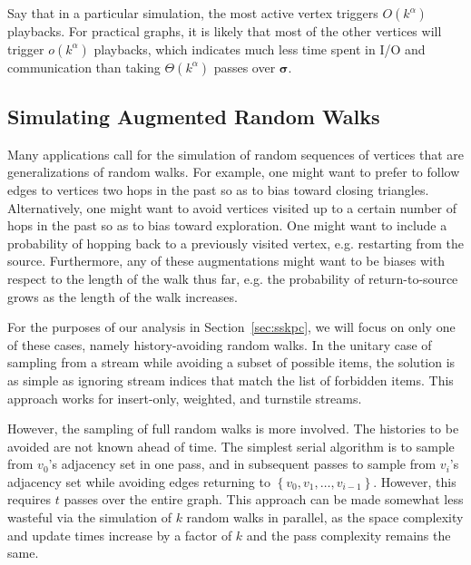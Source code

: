 \documentclass[10]{article}
\begin{document}
Say that in a particular simulation, the most active vertex triggers $O(k^\alpha)$ playbacks.
For practical graphs, it is likely that most of the other vertices will trigger $o(k^\alpha)$ playbacks, which indicates much less time spent in I/O and communication than taking $\Theta(k^\alpha)$ passes over $\boldsymbol{\sigma}$.



\subsection{Simulating Augmented Random Walks}
 \label{walks:sec:walks:augmented}

Many applications call for the simulation of random sequences of vertices that are generalizations of random walks. 
For example, one might want to prefer to follow edges to vertices two hops in the past so as to bias toward closing triangles. 
Alternatively, one might want to avoid vertices visited up to a certain number of hops in the past so as to bias toward exploration. 
One might want to include a probability of hopping back to a previously visited vertex, e.g. restarting from the source. 
Furthermore, any of these augmentations might want to be biases with respect to the length of the walk thus far, e.g. the probability of return-to-source grows as the length of the walk increases.

For the purposes of our analysis in Section~\ref{sec:sskpc}, we will focus on only one of these cases, namely history-avoiding random walks.
In the unitary case of sampling from a stream while avoiding a subset of possible items, the solution is as simple as ignoring stream indices that match the list of forbidden items.
This approach works for insert-only, weighted, and turnstile streams. 

However, the sampling of full random walks is more involved.
The histories to be avoided are not known ahead of time.
The simplest serial algorithm is to sample from $v_0$'s adjacency set in one pass, and in subsequent passes to sample from $v_i$'s adjacency set while avoiding edges returning to $\left \{ v_0, v_1, \dots, v_{i-1} \right \}$. 
However, this requires $t$ passes over the entire graph.
This approach can be made somewhat less wasteful via the simulation of $k$ random walks in parallel, as the space complexity and update times increase by a factor of $k$ and the pass complexity remains the same. 
\end{document}
